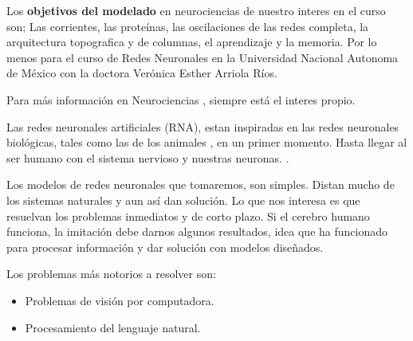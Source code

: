 Los \textbf{objetivos del modelado} en neurociencias de nuestro interes en el curso son; Las corrientes, las proteínas, las oscilaciones de las redes completa, la arquitectura topografica y de columnas, el aprendizaje y la memoria. Por lo menos para el curso de Redes Neuronales en la Universidad Nacional Autonoma de México con la doctora Verónica Esther Arriola Ríos.

Para más información en Neurociencias \parencite{princNS5}, siempre está el interes propio.

Las redes neuronales artificiales (RNA), estan inspiradas en las redes neuronales biológicas, tales como las de los animales \parencite{incipiencias}, en un primer momento. Hasta llegar al ser humano con el sistema nervioso y nuestras neuronas. \parencite{ideaNeurona}. 

Los modelos de redes neuronales que tomaremos, son simples. Distan mucho de los sistemas naturales y aun así dan solución. Lo que nos interesa es que resuelvan los problemas inmediatos y de corto plazo. Si el cerebro humano funciona, la imitación debe darnos algunos resultados, idea que ha funcionado para procesar información y dar solución con modelos diseñados. 

Los problemas más notorios a resolver son: 
\begin{itemize}
\item Problemas de visión por computadora.
\item Procesamiento del lenguaje natural.
\end{itemize}
